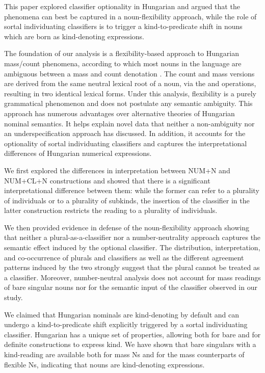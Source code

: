 \documentclass[output=paper]{langscibook}
\begin{document}
This paper explored classifier optionality in Hungarian and argued that the phenomena can best be captured in a noun-flexibility approach, while the role of sortal individuating classifiers is to trigger a kind-to-predicate shift in nouns which are born as kind-denoting expressions.  

The foundation of our analysis is a flexibility-based approach to Hungarian mass/count phenomena, according to which most nouns in the language are ambiguous between a mass and count denotation \citep{schvarcz-rothstein-17}. The count and mass versions are derived from the same neutral lexical root of a noun, via the  and  operations, resulting in  two identical lexical forms. Under this analysis, flexibility is a purely grammatical phenomenon and does not postulate any semantic ambiguity. This approach has numerous advantages over alternative theories of Hungarian nominal semantics. It  helps explain novel data that neither a non-ambiguity \citep{dekany-11, csirmaz-dekany-14} nor an underspecification \citep{erbach-etal-19} approach has discussed. In addition, it accounts for the optionality of sortal individuating classifiers and captures the interpretational differences of Hungarian numerical expressions. 

We first explored the differences in interpretation between NUM+N and \linebreak NUM+CL+N constructions and showed that there is a significant interpretational difference between them: while the former can refer to a plurality of individuals or to a plurality of subkinds, the insertion of the classifier in the latter construction restricts the reading to a plurality of individuals. 

We then provided evidence in defense of the noun-flexibility approach showing that neither a plural-as-a-classifier nor a number-neutrality approach captures the semantic effect induced by the optional classifier.  The distribution, interpretation, and co-occurrence of plurals and classifiers as well as the different agreement patterns induced by the two strongly suggest that the plural cannot be treated as a classifier. Moreover, number-neutral analysis does not account for mass readings of bare singular nouns nor for the semantic input of the classifier observed in our study. 

We claimed that Hungarian nominals are kind-denoting by default and can undergo a kind-to-predicate shift \citep{chierchia-98a} explicitly triggered by a sortal individuating classifier. Hungarian has a unique set of properties, allowing both for bare and for definite constructions to express kind. We have shown that bare singulars with a kind-reading are available both for mass Ns and for the mass counterparts of flexible Ns, indicating that nouns are kind-denoting expressions. 
\end{document}
